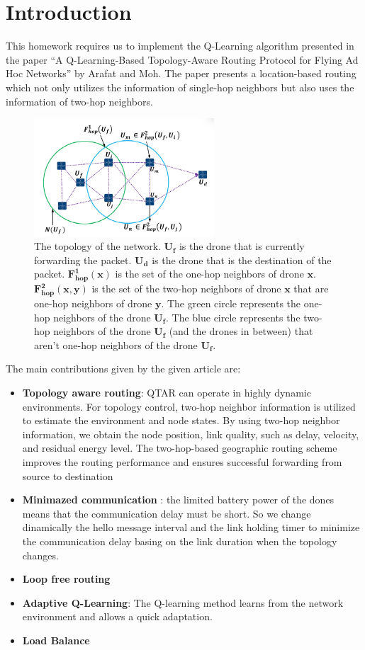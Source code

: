 \section{Introduction}
This homework requires us to implement the Q-Learning algorithm presented in
the paper ``A Q-Learning-Based Topology-Aware Routing Protocol for
Flying Ad Hoc Networks''  by Arafat and Moh.
The paper presents a location-based routing which not only utilizes
the information of single-hop neighbors but also uses the information
of two-hop neighbors.

\begin{figure}[h]
    \centering
    \includegraphics[width=0.6\textwidth]{Figures/paper-fig-6.png}
    \caption{
        The topology of the network.
        $\mathbf{U_f}$ is the drone that is currently forwarding the packet.
        $\mathbf{U_d}$ is the drone that is the destination of the packet.
        $\mathbf{F^1_{hop}(x)}$ is the set of the one-hop neighbors of drone $\mathbf{x}$.
        $\mathbf{F^2_{hop}(x, y)}$ is the set of the two-hop neighbors of drone $\mathbf{x}$ that are one-hop neighbors of drone $\mathbf{y}$.
        The green circle represents the one-hop neighbors of the drone $\mathbf{U_f}$.
        The blue circle represents the two-hop neighbors of the drone $\mathbf{U_f}$ (and the drones in between) that aren't one-hop neighbors of the drone $\mathbf{U_f}$.
    }\label{fig:topology}
\end{figure}
\newpage
The main contributions given by the given article are:
\begin{itemize}
    \item \textbf{Topology aware routing}: QTAR can operate in highly dynamic environments. For
    topology control, two-hop neighbor information is utilized to estimate the environment and node states. By
    using two-hop neighbor information, we obtain the node
    position, link quality, such as delay, velocity, and residual energy level. The two-hop-based geographic routing
    scheme improves the routing performance and ensures
    successful forwarding from source to destination
    \item \textbf{Minimazed communication }: the limited battery power of the dones means that the communication delay must be short. So we change dinamically the hello message interval and the link holding timer to minimize the communication delay basing on the link duration when the topology changes.
    \item \textbf{Loop free routing}
    \item \textbf{Adaptive Q-Learning}: The Q-learning method learns from
    the network environment and allows a quick adaptation.
    \item \textbf{Load Balance}
\end{itemize}